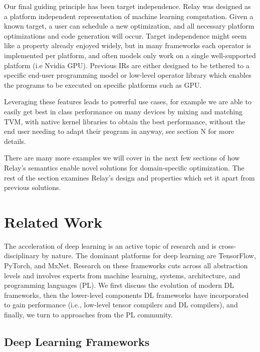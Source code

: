 Our final guiding principle has been target independence. Relay was designed as a platform independent representation of machine learning computation. Given a known target, a user can schedule a new optimization, and all necessary platform optimizations and code generation will occur. Target independence might seem like a property already enjoyed widely, but in many frameworks each operator is implemented per platform, and often models only work on a single well-supported platform (i.e Nvidia GPU).  Previous IRs are either designed to be tethered to a specific end-user programming model or low-level operator library which enables the programs to be executed on specific platforms such as GPU.

Leveraging these features leads to powerful use cases, for example we are able to easily get best in class performance on many devices by mixing and matching TVM, with native kernel libraries to obtain the best performance, without the end user needing to adapt their program in anyway, see section N for more details.

There are many more examples we will cover in the next few sections of how Relay’s semantics enable novel solutions for domain-specific optimization. The rest of the section examines Relay’s design and properties which set it apart from previous solutions.

\section{Related Work}
\label{sec:related}


The acceleration of deep learning is an active topic of research and is
  cross-disciplinary by nature.
The dominant platforms for deep learning are TensorFlow, PyTorch, and MxNet.
Research on these frameworks cuts across all abstraction levels and
  involves experts from machine learning, systems, architecture, and programming languages (PL).
We first discuss the evolution of modern DL frameworks,
  then the lower-level components DL frameworks have incorporated to gain performance
  (i.e., low-level tensor compilers and DL compilers),
  and finally, we turn to approaches from the PL community.

\subsection{Deep Learning Frameworks}

